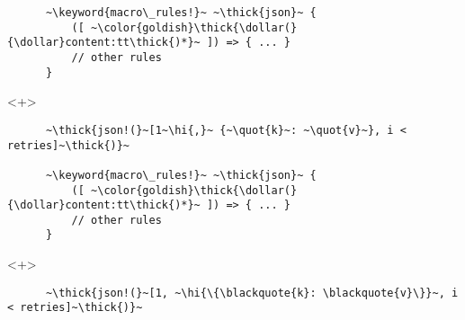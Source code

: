 \documentclass[usepdftitle=false]{beamer}
\newcommand{\dollar}{\makebox[\widthof{\$}][c]{\$}}
\newcommand{\thick}[1]{\contourlength{0.16pt}\contour[10]{black}{#1}}
\newcommand{\slantbox}[2][.5]
  {%
    \mbox
      {%
        \sbox{\foobox}{#2}%
        \hskip\wd\foobox
        \pdfsave
        \pdfsetmatrix{1 0 #1 1}%
        \llap{\usebox{\foobox}}%
        \pdfrestore
      }%
  }
\newcommand{\backslantbox}[2][.5]
  {%
    \mbox
      {%
        \sbox{\foobox}{#2}%
        \hskip\wd\foobox
        \pdfsave
        \pdfsetmatrix{-1 0 #1 1}%
        \llap{\usebox{\foobox}}%
        \pdfrestore
      }%
  }
\newcommand{\hi}[1]{%
\tikz[baseline=(A.base)]
 \node[highlighting=yellowbg,inner sep=0pt,text depth=0pt] (A) {#1};%
}
\newcommand{\openquote}{\backslantbox[.2]{\hspace{11pt}''\hspace{-11pt}}}
\newcommand{\closequote}{\slantbox[-.2]{\hspace{2pt}''\hspace{-2pt}}}
\newcommand{\blackquote}[1]{\openquote#1\closequote}
\newcommand{\quot}[1]{{\color{redish}\blackquote{#1}}}
\newcommand{\keyword}[1]{\color{greenish}#1}
\begin{document}
\begin{frame}[fragile]
\begin{onlyenv}
\begin{verbatim}
      ~\keyword{macro\_rules!}~ ~\thick{json}~ {
          ([ ~\color{goldish}\thick{\dollar(}{\dollar}content:tt\thick{)*}~ ]) => { ... }
          // other rules
      }
    \end{verbatim}
  \end{onlyenv}
  \begin{onlyenv}<+>
    \vspace{-20.5pt}
    \begin{verbatim}
      ~\thick{json!(}~[1~\hi{,}~ {~\quot{k}~: ~\quot{v}~}, i < retries]~\thick{)}~

      ~\keyword{macro\_rules!}~ ~\thick{json}~ {
          ([ ~\color{goldish}\thick{\dollar(}{\dollar}content:tt\thick{)*}~ ]) => { ... }
          // other rules
      }
    \end{verbatim}
  \end{onlyenv}
  \begin{onlyenv}<+>
    \vspace{-20.5pt}
    \begin{verbatim}
      ~\thick{json!(}~[1, ~\hi{\{\blackquote{k}: \blackquote{v}\}}~, i < retries]~\thick{)}~


\end{verbatim}
\end{onlyenv}
\end{frame}
\end{document}
